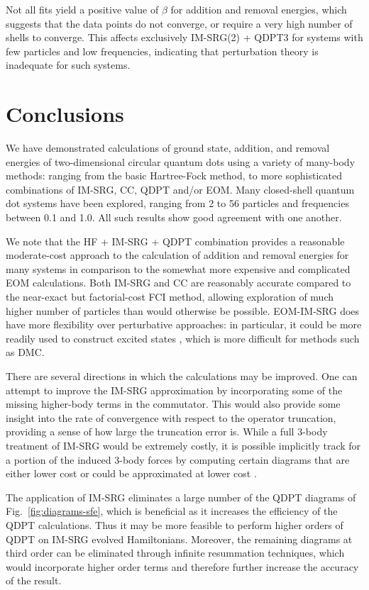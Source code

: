Not all fits yield a positive value of $\beta$ for addition and removal energies, which suggests that the data points do not converge, or require a very high number of shells to converge.  This affects exclusively IM-SRG(2) + QDPT3 for systems with few particles and low frequencies, indicating that perturbation theory is inadequate for such systems.

\section{Conclusions}
\label{sec:conclusions}

We have demonstrated calculations of ground state, addition, and removal energies of two-dimensional circular quantum dots using a variety of many-body methods: ranging from the basic Hartree-Fock method, to more sophisticated combinations of IM-SRG, CC, QDPT and/or EOM.  Many closed-shell quantum dot systems have been explored, ranging from 2 to 56 particles and frequencies between 0.1 and 1.0.  All such results show good agreement with one another.

We note that the HF + IM-SRG + QDPT combination provides a reasonable moderate-cost approach to the calculation of addition and removal energies for many systems in comparison to the somewhat more expensive and complicated EOM calculations.  Both IM-SRG and CC are reasonably accurate compared to the near-exact but factorial-cost FCI method, allowing exploration of much higher number of particles than would otherwise be possible.  EOM-IM-SRG does have more flexibility over perturbative approaches: in particular, it could be more readily used to construct excited states \cite{2016arXiv161100661P}, which is more difficult for methods such as DMC.

There are several directions in which the calculations may be improved.  One can attempt to improve the IM-SRG approximation by incorporating some of the missing higher-body terms in the commutator.  This would also provide some insight into the rate of convergence with respect to the operator truncation, providing a sense of how large the truncation error is.  While a full 3-body treatment of IM-SRG would be extremely costly, it is possible implicitly track for a portion of the induced 3-body forces by computing certain diagrams that are either lower cost or could be approximated at lower cost \cite{IMSRG}.

The application of IM-SRG eliminates a large number of the QDPT diagrams of Fig.\ \ref{fig:diagrams-sfe}, which is beneficial as it increases the efficiency of the QDPT calculations.  Thus it may be more feasible to perform higher orders of QDPT on IM-SRG evolved Hamiltonians.  Moreover, the remaining diagrams at third order can be eliminated through infinite resummation techniques, which would incorporate higher order terms and therefore further increase the accuracy of the result.

